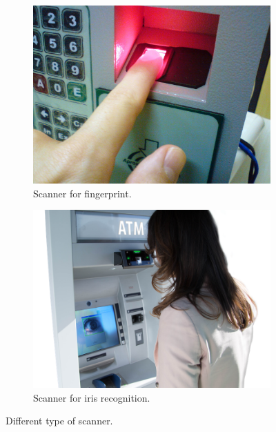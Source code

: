 \documentclass[12pt]{report}
\begin{document}
\begin{figure}[htbp]
    \centering
    \begin{subfigure}[t]{0.45\textwidth}
        \centering
        \includegraphics[width=\linewidth]{Images/Theory/Fingerprint_scanner_identification.jpg}
        \caption{Scanner for fingerprint.}
        \label{fig:scanner_fingerprint}
    \end{subfigure}
    \hfill
    \begin{subfigure}[t]{0.45\textwidth}
        \centering
        \includegraphics[width=\linewidth]{Images/Theory/eye.png}
        \caption{Scanner for iris recognition.}
        \label{fig:scanner_eye}
    \end{subfigure}
    \caption{Different type of scanner.}
    \label{fig:scanners}
\end{figure}
\end{document}
